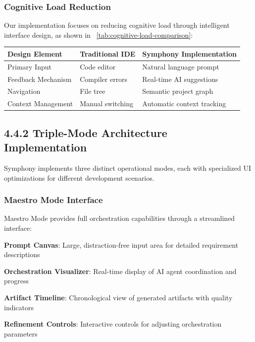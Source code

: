 \subsubsection*{Cognitive Load Reduction}

Our implementation focuses on reducing cognitive load through intelligent interface design, as shown in ~\ref{tab:cognitive-load-comparison}:

\begin{center}
\begin{tabular}{@{}lll@{}}
\toprule
\textbf{Design Element} & \textbf{Traditional IDE} & \textbf{Symphony Implementation} \\
\midrule
Primary Input & Code editor & Natural language prompt \\
Feedback Mechanism & Compiler errors & Real-time AI suggestions \\
Navigation & File tree & Semantic project graph \\
Context Management & Manual switching & Automatic context tracking \\
\bottomrule
\end{tabular}
\label{tab:cognitive-load-comparison}
\end{center}

\subsection*{4.4.2 Triple-Mode Architecture Implementation}
\label{subsec:triple-mode-implementation}

Symphony implements three distinct operational modes, each with specialized UI optimizations for different development scenarios.

\subsubsection*{Maestro Mode Interface}

Maestro Mode provides full orchestration capabilities through a streamlined interface:

\begin{expandedlist}
    \item \textbf{Prompt Canvas}: Large, distraction-free input area for detailed requirement descriptions
    \item \textbf{Orchestration Visualizer}: Real-time display of AI agent coordination and progress
    \item \textbf{Artifact Timeline}: Chronological view of generated artifacts with quality indicators
    \item \textbf{Refinement Controls}: Interactive controls for adjusting orchestration parameters
\end{expandedlist}


